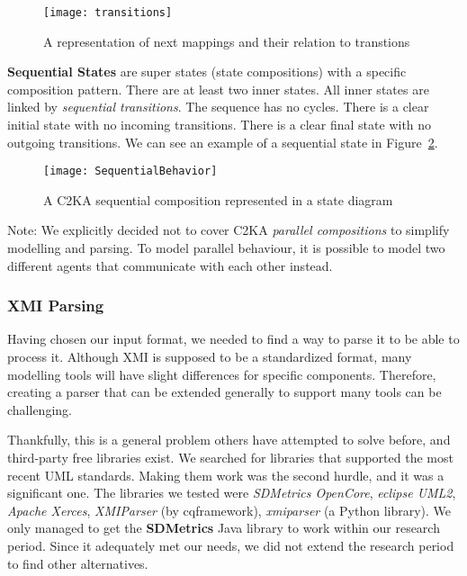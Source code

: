 \begin{figure}[ht]
    \centering
    \texttt{[image: transitions]}
    \caption{A representation of next mappings and their relation to transtions}
    \label{fig:transition}
\end{figure}

\textbf{Sequential States} are super states (state compositions) with a specific composition pattern.
There are at least two inner states.
All inner states are linked by \textit{sequential transitions}.
The sequence has no cycles.
There is a clear initial state with no incoming transitions.
There is a clear final state with no outgoing transitions.
We can see an example of a sequential state in Figure~\ref{fig:sequential}.

\begin{figure}[ht]
    \centering
    \texttt{[image: SequentialBehavior]}
    \caption{A C2KA sequential composition represented in a state diagram}
    \label{fig:sequential}
\end{figure}

Note: We explicitly decided not to cover C2KA \textit{parallel compositions} to simplify modelling and parsing.
To model parallel behaviour, it is possible to model two different agents that communicate
with each other instead.

\subsubsection{XMI Parsing}\label{subsubsec:parsing}
Having chosen our input format, we needed to find a way to parse it to be able to process it.
Although XMI is supposed to be a standardized format,
many modelling tools will have slight differences for specific components.
Therefore, creating a parser that can be extended generally to support many tools can be challenging.

Thankfully, this is a general problem others have attempted to solve before, and third-party free libraries exist.
We searched for libraries that supported the most recent UML standards.
Making them work was the second hurdle, and it was a significant one.
The libraries we tested were \textit{SDMetrics OpenCore},
\textit{eclipse UML2}, \textit{Apache Xerces}, \textit{XMIParser} (by cqframework), \textit{xmiparser} (a Python library).
We only managed to get the \textbf{SDMetrics} Java library to work within our research period.
Since it adequately met our needs, we did not extend the research period to find other alternatives.

